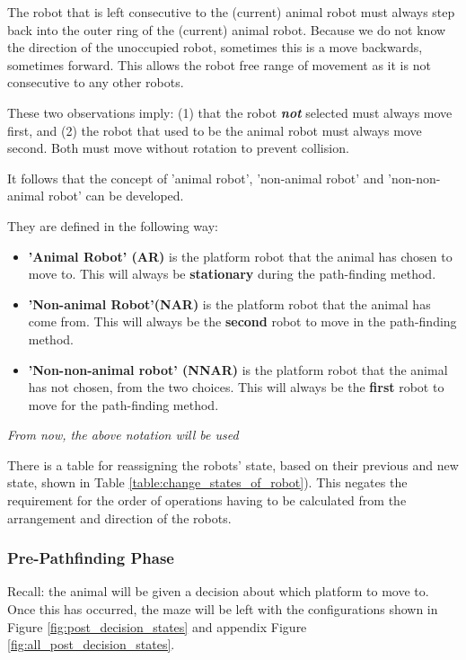 The robot that is left consecutive to the (current) animal robot must always step back into the outer ring of the (current) animal robot. Because we do not know the direction of the unoccupied robot, sometimes this is a move backwards, sometimes forward. This allows the robot free range of movement as it is not consecutive to any other robots.

These two observations imply: (1) that the robot \textbf{\textit{not}} selected must always move first, and (2) the robot that used to be the animal robot must always move second. Both must move without rotation to prevent collision.

It follows that the concept of 'animal robot', 'non-animal robot' and 'non-non-animal robot' can be developed.
\begin{tcolorbox}
They are defined in the following way:
\begin{itemize}
    \item \textbf{'Animal Robot' (AR)} is the platform robot that the animal has chosen to move to. This will always be \textbf{stationary} during the path-finding method.
    \item \textbf{'Non-animal Robot'(NAR)} is the platform robot that the animal has come from. This will always be the \textbf{second} robot to move in the path-finding method.
    \item \textbf{'Non-non-animal robot' (NNAR)} is the platform robot that the animal has not chosen, from the two choices. This will always be the \textbf{first} robot to move for the path-finding method.
\end{itemize}
\begin{center}
\textit{From now, the above notation will be used}
\end{center}
\end{tcolorbox}
There is a table for reassigning the robots' state, based on their previous and new state, shown in Table \ref{table:change_states_of_robot}).
This negates the requirement for the order of operations having to be calculated from the arrangement and direction of the robots.

\subsubsection{Pre-Pathfinding Phase}
\label{section:pre_pathfinding}

Recall: the animal will be given a decision about which platform to move to. Once this has occurred, the maze will be left with the configurations shown in Figure \ref{fig:post_decision_states} and appendix Figure  \ref{fig:all_post_decision_states}.



